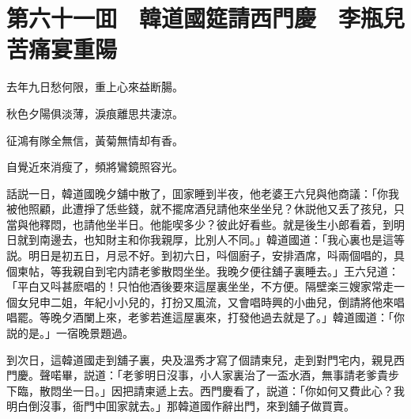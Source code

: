 
\chapter*{第六十一囬　韓道國筵請西門慶　李瓶兒苦痛宴重陽}

去年九日愁何限，重上心來益断腸。

秋色夕陽俱淡薄，淚痕離思共淒涼。

征鴻有隊全無信，黃菊無情却有香。

自覺近來消瘦了，頻將鸞鏡照容光。

話説一日，韓道國晚夕舖中散了，囬家睡到半夜，他老婆王六兒與他商議：「你我被他照顧，此遭掙了恁些錢，就不擺席酒兒請他來坐坐兒？休説他又丢了孩兒，只當與他釋悶，也請他坐半日。他能喫多少？彼此好看些。就是後生小郎看着，到明日就到南邊去，也知財主和你我親厚，比別人不同。」韓道國道：「我心裏也是這等説。明日是初五日，月忌不好。到初六日，呌個廚子，安排酒席，呌兩個唱的，具個柬帖，等我親自到宅内請老爹散悶坐坐。我晚夕便往舖子裏睡去。」王六兒道：「平白又呌甚麽唱的！只怕他酒後要來這屋裏坐坐，不方便。隔壁楽三嫂家常走一個女兒申二姐，年紀小小兒的，打扮又風流，又會唱時興的小曲兒，倒請將他來唱唱罷。等晚夕酒闌上來，老爹若進這屋裏來，打發他過去就是了。」韓道國道：「你説的是。」一宿晚景題過。

到次日，這韓道國走到舖子裏，央及溫秀才寫了個請柬兒，走到對門宅内，親見西門慶。聲喏畢，説道：「老爹明日沒事，小人家裏治了一盃水酒，無事請老爹貴步下臨，散悶坐一日。」因把請柬遞上去。西門慶看了，説道：「你如何又費此心？我明白倒沒事，衙門中囬家就去。」那韓道國作辭出門，來到舖子做買賣。

